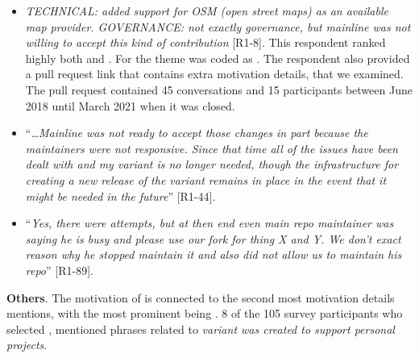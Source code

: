 \begin{itemize}[leftmargin=*]
\item \emph{TECHNICAL: added support for OSM (open street maps) as an available map provider. GOVERNANCE: not exactly governance, but mainline was not willing to accept this kind of contribution} [R1-8]. This respondent ranked highly both  and . For  the theme was coded as . The respondent also provided a \gh pull request link that contains extra motivation details, that we examined. The pull request contained 45 conversations and 15 participants between June 2018 until March 2021 when it was closed.

\item ``\emph{\ldots Mainline was not ready to accept those changes in part because the maintainers were not responsive. Since that time all of the issues have been dealt with and my variant is no longer needed, though the infrastructure for creating a new release of the variant remains in place in the event that it might be needed in the future}'' [R1-44].

\item ``\emph{Yes, there were attempts, but at then end even main repo maintainer was saying he is busy and please use our fork for thing X and Y. We don't exact reason why he stopped maintain it and also did not allow us to maintain his repo}'' [R1-89]. 

\end{itemize}


\nd \textbf{Others}. The motivation of  is connected to the second most motivation details mentions, with the most prominent being . 8 of the 105 survey participants who selected , mentioned phrases related to \emph{variant was created to support personal projects}.


